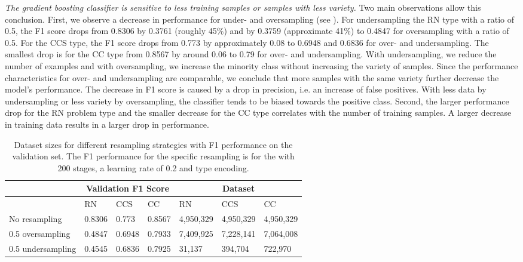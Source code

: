 \textit{The gradient boosting classifier is sensitive to less training samples or samples with less variety.} Two main observations allow this conclusion. First, we observe a decrease in performance for under- and oversampling (see  ). For undersampling the RN type with a ratio of 0.5, the F1 score drops from 0.8306 by 0.3761 (roughly 45\%) and by 0.3759 (approximate 41\%) to 0.4847 for oversampling with a ratio of 0.5. For the CCS type, the F1 score drops from 0.773 by approximately 0.08 to 0.6948 and 0.6836 for over- and undersampling. The smallest drop is for the CC type from 0.8567 by around 0.06 to 0.79 for over- and undersampling. With undersampling, we reduce the number of examples and with oversampling, we increase the minority class without increasing the variety of samples. Since the performance characteristics for over- and undersampling are comparable, we conclude that more samples with the same variety further decrease the model's performance. The decrease in F1 score is caused by a drop in precision, i.e. an increase of false positives. With less data by undersampling or less variety by oversampling, the classifier tends to be biased towards the positive class.
Second, the larger performance drop for the RN problem type and the smaller decrease for the CC type correlates with the number of training samples. A larger decrease in training data results in a larger drop in performance. 

\begin{table}[]
    \tabcolsep=0.11cm
    \begin{tabularx}{\textwidth}{lXXX|XXX}
    \toprule
                        & \multicolumn{3}{c}{Validation F1 Score} & \multicolumn{3}{c}{Dataset}   \\ \midrule
                        & RN        & CCS        & CC     & RN            & CCS         & CC          \\ \midrule
    No resampling     &  0.8306   &  0.773    &  0.8567  &  4,950,329    & 4,950,329   & 4,950,329   \\ \midrule
    0.5 oversampling  &  0.4847   &  0.6948   &  0.7933  &  7,409,925    & 7,228,141   & 7,064,008   \\
    0.5 undersampling &  0.4545   &  0.6836   &  0.7925  &  31,137       & 394,704     & 722,970     \\ \bottomrule
    \end{tabularx}
    \caption{Dataset sizes for different resampling strategies with F1 performance on the validation set. The F1 performance for the specific resampling is for the  with 200 stages, a learning rate of 0.2 and type encoding.}
    \label{tab:resampling_size_performance_gbc}
    \end{table}

